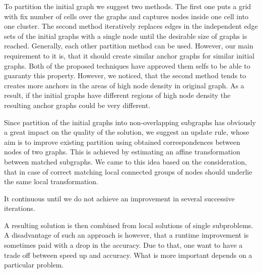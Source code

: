 To partition the initial graph we suggest two methods. The first one puts a grid with fix number of cells over the graphs and captures nodes inside one cell into one cluster. The second method iteratively replaces edges in the independent edge sets of the initial graphs with a single node until the desirable size of graphs is reached. Generally, each other partition method can be used. However, our main requirement to it is, that it should create similar anchor graphs for similar initial graphs. Both of the proposed techniques have approved them selfs to be able to guaranty this property. However, we noticed, that the second method tends to creates more anchors in the areas of high node density in original graph. As a result, if the initial graphs have different regions of high node density the resulting anchor graphs could be very different.

Since partition of the initial graphs into non-overlapping subgraphs has obviously a great impact on the quality of the solution, we suggest an update rule, whose aim is to improve existing partition using obtained correspondences between nodes of two graphs. This is achieved by estimating an affine transformation between matched subgraphs. We came to this idea based on the consideration, that in case of correct matching local connected groups of nodes should underlie the same local transformation.


It continuous until we do not achieve an improvement in several successive iterations.


 A resulting solution is then combined from local solutions of single subproblems. A disadvantage of such an approach is however, that a runtime improvement is sometimes paid with a drop in the accuracy.
Due to that, one want to have a trade off between speed up and accuracy. What is more important depends on a particular problem.






